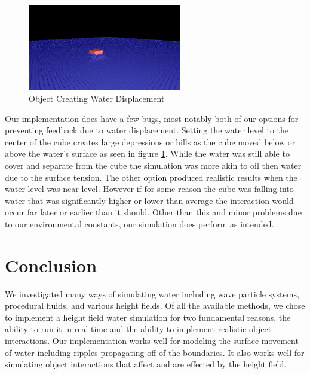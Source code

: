 \documentclass[11pt]{article}
\begin{document}
\begin{figure}[H]
    \caption{Object Creating Water Displacement}
    \label{fig:displacement}
    \centering
    \includegraphics[width=0.6\textwidth]{../www/images/objectWaterDisplacement}
\end{figure}

Our implementation does have a few bugs, most notably both of our options for 
preventing feedback due to water displacement.  Setting the water level to the 
center of the cube creates large depressions or hills as the cube moved below 
or above the water’s surface as seen in figure \ref{fig:displacement}.  While 
the water was still able to cover and separate from the cube the simulation was 
more akin to oil then water due to the surface tension.  The other option 
produced realistic results when the water level was near level.  However if for 
some reason the cube was falling into water that was significantly higher or 
lower than average the interaction would occur far later or earlier than it 
should.  Other than this and minor problems due to our environmental constants, 
our simulation does perform as intended.

\section{Conclusion}

We investigated many ways of simulating water including wave particle systems, 
procedural fluids, and various height fields. Of all the available methods, we 
chose to implement a height field water simulation for two fundamental reasons, 
the ability to run it in real time and the ability to implement realistic 
object interactions. Our implementation works well for modeling the surface 
movement of water including ripples propagating off of the boundaries. It also 
works well for simulating object interactions that affect and are effected by 
the height field.
\end{document}
